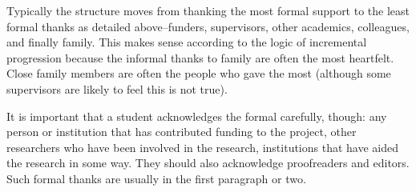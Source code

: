 \begin{acknowledgements}
Typically the structure moves from thanking the most formal support to the least formal thanks as detailed above–funders, supervisors, other academics, colleagues, and finally family. This makes sense according to the logic of incremental progression because the informal thanks to family are often the most heartfelt. Close family members are often the people who gave the most (although some supervisors are likely to feel this is not true).

It is important that a student acknowledges the formal carefully, though: any person or institution that has contributed funding to the project, other researchers who have been involved in the research, institutions that have aided the research in some way. They should also acknowledge proofreaders and editors. Such formal thanks are usually in the first paragraph or two.
\end{acknowledgements}